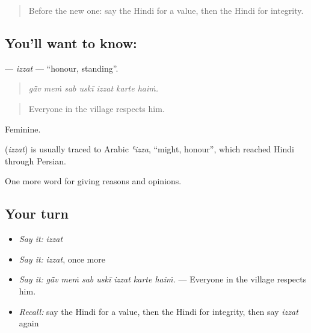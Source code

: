 \label{lesson:HI-C357-izzat}



\begin{quote}
Before the new one: say the Hindi for a value, then the Hindi for integrity.
\end{quote}

\subsection*{You'll want to know: }
\textbf{} — \emph{izzat} — \textquotedblleft{}honour, standing\textquotedblright{}.

\begin{quote}
      
\end{quote}

\begin{quote}
\emph{gā̃v meṁ sab uskī izzat karte haiṁ.}
\end{quote}

\begin{quote}
Everyone in the village respects him.
\end{quote}

Feminine.

\begin{cousinweb}
\textbf{} (\emph{izzat}) is usually traced to Arabic \emph{ʿizza}, \textquotedblleft{}might, honour\textquotedblright{}, which reached Hindi through Persian.
\end{cousinweb}

\begin{grammarlens}[title={What you've built}]
One more word for giving reasons and opinions.
\end{grammarlens}

\subsection*{Your turn}
\begin{itemize}
\raggedright
  \item \emph{Say it:} \emph{izzat}
  \item \emph{Say it:} \emph{izzat}, once more
  \item \emph{Say it:} \emph{gā̃v meṁ sab uskī izzat karte haiṁ.} — Everyone in the village respects him.
  \item \emph{Recall:} say the Hindi for a value, then the Hindi for integrity, then say \emph{izzat} again
\end{itemize}


